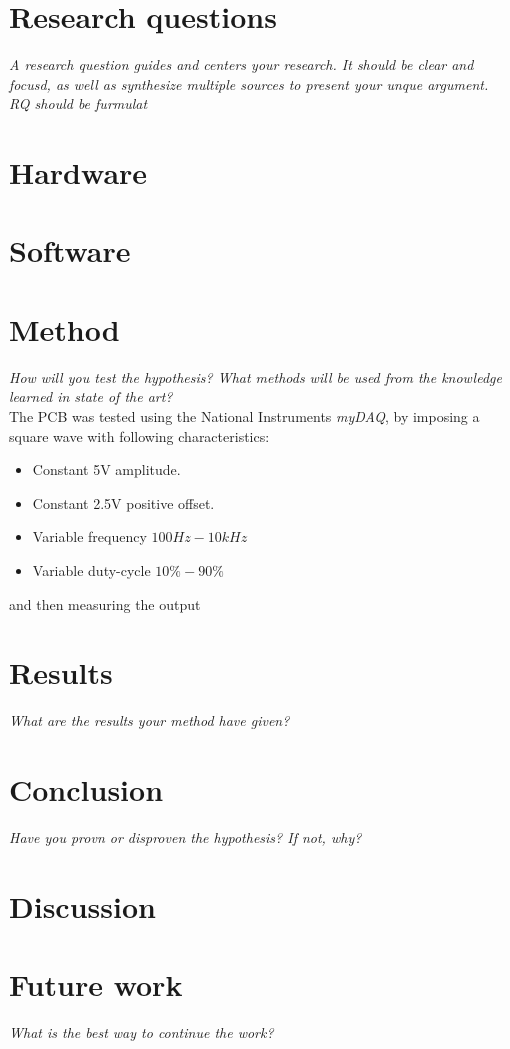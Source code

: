 \documentclass[conference]{IEEEtran}
\begin{document}
\section{Research questions}
\textit{A research question guides and centers your research. It should be clear and focusd, as well as synthesize multiple sources to present your unque argument. RQ should be furmulat}
\section{Hardware}

\section{Software}

\section{Method}
\textit{How will you test the hypothesis? What methods will be used from the knowledge learned in state of the art?}
\\The PCB was tested using the National Instruments \textit{myDAQ}, by imposing a square wave with following characteristics:
\begin{itemize}
        \item Constant 5V amplitude.
        \item Constant 2.5V positive offset.
        \item Variable frequency $100Hz-10kHz$
        \item Variable duty-cycle $10\% - 90\%$
\end{itemize}
and then measuring the output
\section{Results}
\textit{What are the results your method have given?}

\section{Conclusion}
\textit{Have you provn or disproven the hypothesis? If not, why?}
\section{Discussion}

\section{Future work}
\textit{What is the best way to continue the work?}
\end{document}
